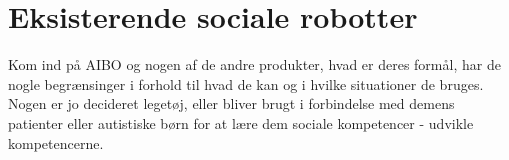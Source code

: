 \section{Eksisterende sociale robotter}
\label{EksisterendeSocialeRobotter}
%
Kom ind på AIBO og nogen af de andre produkter, hvad er deres formål, har de nogle begrænsinger i forhold til hvad de kan og i hvilke situationer de bruges. Nogen er jo decideret legetøj, eller bliver brugt i forbindelse med demens patienter eller autistiske børn for at lære dem sociale kompetencer - udvikle kompetencerne. 